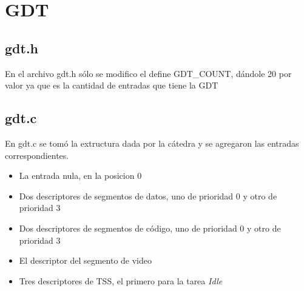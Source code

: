 
\section{GDT}
\subsection{gdt.h}
En el archivo gdt.h s\'olo se modifico el define GDT_COUNT, d\'andole 20 por valor ya que es la cantidad de entradas que tiene la GDT

\subsection{gdt.c}
En gdt.c se tom\'o la extructura dada por la c\'atedra y se agregaron las entradas correspondientes.

\begin{itemize}
	\item La entrada nula, en la posicion 0
	
	\item Dos descriptores de segmentos de datos, uno de prioridad 0 y otro de prioridad 3

	\item Dos descriptores de segmentos de c\'odigo, uno de prioridad 0 y otro de prioridad 3
	
	\item El descriptor del segmento de video
	
	\item Tres descriptores de TSS, el primero para la tarea \textit{Idle}
\end{itemize}
